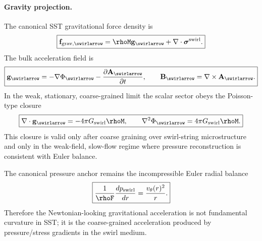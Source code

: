         \paragraph{Gravity projection.}
        The canonical SST gravitational force density is
        \begin{align}
            \boxed{
            \mathbf{f}_{\mathrm{grav},\swirlarrow}
            =
            \rhoM\mathbf{g}_{\swirlarrow}
            +
            \nabla\cdot\boldsymbol{\sigma}^{\mathrm{swirl}}.
            }
            \label{eq:canonical_sst_grav_force_density}
        \end{align}
        The bulk acceleration field is
        \begin{align}
            \boxed{
            \mathbf{g}_{\swirlarrow}
            =
            -\nabla\Phi_{\swirlarrow}
            -
            \frac{\partial\mathbf{A}_{\swirlarrow}}{\partial t},
            \qquad
            \mathbf{B}_{\swirlarrow}
            =
            \nabla\times\mathbf{A}_{\swirlarrow}.
            }
            \label{eq:canonical_gravito_swirl_fields}
        \end{align}
        In the weak, stationary, coarse-grained limit the scalar sector obeys the Poisson-type closure
        \begin{align}
            \boxed{
            \nabla\cdot\mathbf{g}_{\swirlarrow}
            =
            -4\pi G_{\mathrm{swirl}}\rhoM,
            \qquad
            \nabla^2\Phi_{\swirlarrow}
            =
            4\pi G_{\mathrm{swirl}}\rhoM.
            }
            \label{eq:canonical_weak_gravity_closure}
        \end{align}
        This closure is valid only after coarse graining over swirl-string microstructure and only in the weak-field, slow-flow regime where pressure reconstruction is consistent with Euler balance.

        The canonical pressure anchor remains the incompressible Euler radial balance
        \begin{align}
            \boxed{
            \frac{1}{\rhoF}\frac{dp_{\mathrm{swirl}}}{dr}
            =
            \frac{v_\theta(r)^2}{r}.
            }
            \label{eq:canonical_emg_euler_anchor}
        \end{align}
        Therefore the Newtonian-looking gravitational acceleration is not fundamental curvature in SST; it is the coarse-grained acceleration produced by pressure/stress gradients in the swirl medium.

